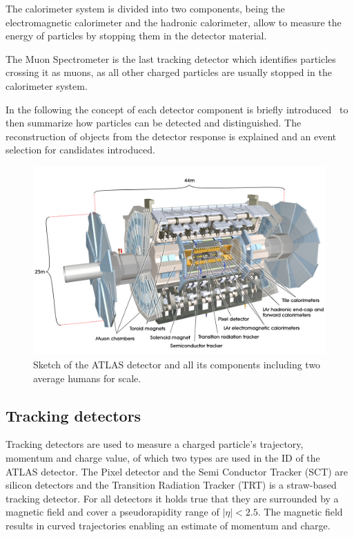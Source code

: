 The calorimeter system is divided into two components, being the electromagnetic calorimeter and the hadronic calorimeter, allow to measure the energy of particles by stopping them in the detector material.

The Muon Spectrometer is the last tracking detector which identifies particles crossing it as muons, as all other charged particles are usually stopped in the calorimeter system.

In the following the concept of each detector component is briefly introduced~\cite{wermes} to then summarize how particles can be detected and distinguished. The reconstruction of objects from the detector response is explained and an event selection for \tW candidates introduced.



\begin{figure}[htbp]
  \centering
  \includegraphics[scale=0.15]{figures_LHC/atlas-detector}
  \caption[Sketch of the ATLAS detector]{Sketch of the ATLAS detector and all its components including two average humans for scale.~\cite{Pequenao:1095924}}
  \label{fig:atlas}
\end{figure}


\subsection{Tracking detectors}

Tracking detectors are used to measure a charged particle's trajectory, momentum and charge value, of which two types are used in the ID of the ATLAS detector. The Pixel detector and the Semi Conductor Tracker (SCT) are silicon detectors and the Transition Radiation Tracker (TRT) is a straw-based tracking detector. For all detectors it holds true that they are surrounded by a magnetic field and cover a pseudorapidity range of $|\eta| < 2.5$. The magnetic field results in curved trajectories enabling an estimate of momentum and charge.\cite{leo}

